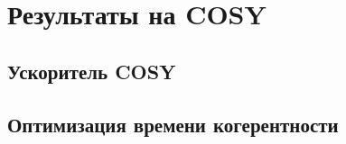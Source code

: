 \chapter{Результаты на COSY}\label{chpt4:COSY}

\section{Ускоритель COSY}




\section{Оптимизация времени когерентности}



\clearpage
